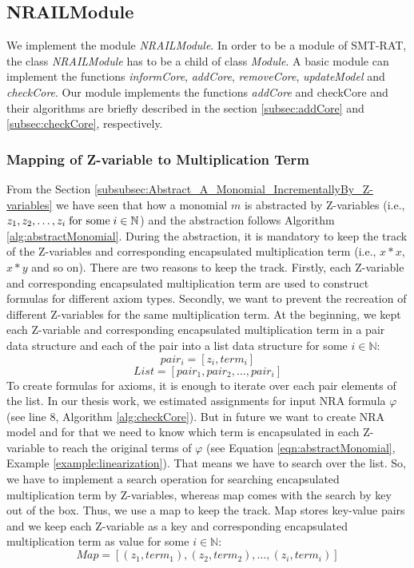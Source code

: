 \subsection{NRAILModule}
\label{subsec:nrailmodule}
We implement the module \textit{NRAILModule}.
In order to be a module of SMT-RAT, the class \textit{NRAILModule} has to be a child of class \textit{Module}.
A basic module can implement the functions \textit{informCore}, \textit{addCore}, \textit{removeCore}, \textit{updateModel} and \textit{checkCore}.
Our module implements the functions \textit{addCore} and {checkCore} and their algorithms are briefly described in the section \ref{subsec:addCore} and \ref{subsec:checkCore}, respectively. \newline


\subsubsection{Mapping of Z-variable to Multiplication Term}
\label{subsubsec:Mapping_of_Z-variable_to_Multiplication_Term}
From the Section \ref{subsubsec:Abstract_A_Monomial_IncrementallyBy_Z-variables} we have seen that how a monomial $m$ is abstracted by Z-variables (i.e., $z_1, z_2,\dots, z_i \hspace{1mm}\text{for some}\hspace{1mm} i \in \mathbb{N}$) and the abstraction follows Algorithm \ref{alg:abstractMonomial}.
During the abstraction, it is mandatory to keep the track of the Z-variables and corresponding encapsulated multiplication term (i.e., $x \ast x$, $x \ast y$ and so on).
There are two reasons to keep the track.
Firstly, each Z-variable and corresponding encapsulated multiplication term are used to construct formulas for different axiom types.
Secondly, we want to prevent the recreation of different Z-variables for the same multiplication term.
At the beginning, we kept each Z-variable and corresponding encapsulated multiplication term in a pair data structure and each of the pair into a list data structure for some $i \in \mathbb{N}$:
$$pair_{i} = [z_{i}, term_{i}]$$
$$List = [pair_{1}, pair_{2}, \dots, pair_{i}]$$
To create formulas for axioms, it is enough to iterate over each pair elements of the list.
In our thesis work, we estimated assignments for input NRA formula $\varphi$ (see line $8$, Algorithm \ref{alg:checkCore}).
But in future we want to create NRA model and for that we need to know which term is encapsulated in each Z-variable to reach the original terms of $\varphi$ (see Equation \ref{eqn:abstractMonomial}, Example \ref{example:linearization}).
That means we have to search over the list.
So, we have to implement a search operation for searching encapsulated multiplication term by Z-variables, whereas map comes with the search by key out of the box.
Thus, we use a map to keep the track.
Map stores key-value pairs and we keep each Z-variable as a key and corresponding encapsulated multiplication term as value for some $i \in \mathbb{N}$:
$$Map = [(z_{1}, term_{1}), (z_{2}, term_{2}), \dots, (z_{i}, term_{i})]$$

